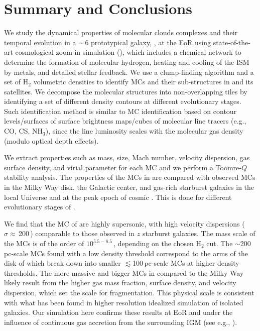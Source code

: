 \IfFileExists{emulateapjlegacy.cls}{\documentclass[iop]{emulateapjlegacy}}{\documentclass[iop]{emulateapj}}
\begin{document}
\section{Summary and Conclusions}      \label{sec:conclusion}

We study the dynamical properties of molecular clouds complexes and their temporal evolution in a \z$\sim$\,6 prototypical galaxy, \flower,
at the EoR using state-of-the-art cosmological zoom-in simulation (),
which includes a chemical network to determine the formation of molecular
hydrogen, heating and cooling of the ISM by metals, and detailed stellar feedback.
We use a clump-finding algorithm and a set of H$_2$ volumetric densities
to identify MCs and their sub-structures in \flower and its satellites.
We decompose the molecular structures into non-overlapping tiles
by identifying a set of different density contours at different evolutionary stages.
Such identification method is similar to MC identification based on 
contour levels/surfaces of surface brightness maps/cubes of molecular line tracers (e.g., CO, CS, NH$_3$),
since the line luminosity scales with the molecular gas density (modulo optical depth effects).

We extract properties such as mass, size, Mach number, velocity dispersion, gas surface density, and virial parameter for each MC and we perform a Toomre-$Q$ stability analysis. The properties of the MCs in \flower are compared with observed MCs in the Milky Way disk, the Galactic center, and gas-rich starburst galaxies in the local Universe and at the peak epoch of cosmic \SF. This is done for different evolutionary stages of \flower.

We find that the MC of \flower are highly supersonic, with high velocity dispersions ($\sigma\approx$\,200\,\kms) comparable to
those observed in $z$ starburst galaxies.
The mass scale of the MCs is of the order of $10^{5.5-8.5}$\,\Msun, depending on the chosen H$_{2}$ cut. 
The $\sim$200\,pc-scale MCs found with a low density threshold
correspond to the arms of the disk of \flower which break down into smaller $\lesssim$100\,pc-scale MCs at higher density thresholds.
The more massive and bigger MCs in \flower compared to the Milky Way
likely result from the higher gas mass fraction, surface density, and velocity dispersion,
which set the scale for fragmentation.
This physical scale is
consistent with what has been found in higher resolution idealized simulation of isolated galaxies.
Our simulation here confirms these results at EoR and under
the influence of continuous gas accretion from the surrounding IGM (see e.g., \citealt{Klessen10a, Goldbaum11a}).
\end{document}
